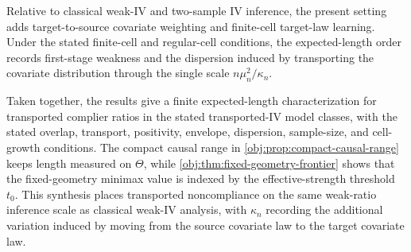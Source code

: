 Relative to classical weak-IV and two-sample IV inference, the present setting adds target-to-source covariate weighting and finite-cell target-law learning. Under the stated finite-cell and regular-cell conditions, the expected-length order records first-stage weakness and the dispersion induced by transporting the covariate distribution through the single scale \(n\mu_n^2/\kappa_n\).

Taken together, the results give a finite expected-length characterization for transported complier ratios in the stated transported-IV model classes, with the stated overlap, transport, positivity, envelope, dispersion, sample-size, and cell-growth conditions. The compact causal range in \cref{obj:prop:compact-causal-range} keeps length measured on \(\Theta\), while \cref{obj:thm:fixed-geometry-frontier} shows that the fixed-geometry minimax value is indexed by the effective-strength threshold \(t_0\). This synthesis places transported noncompliance on the same weak-ratio inference scale as classical weak-IV analysis, with \(\kappa_n\) recording the additional variation induced by moving from the source covariate law to the target covariate law.
